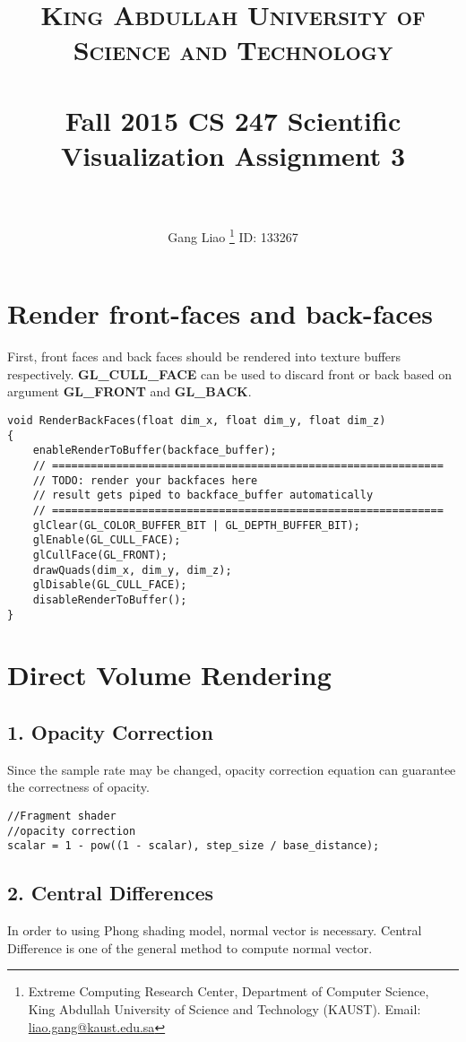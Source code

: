 \documentclass[12pt,letterpaper,fleqn]{article}          %
\title{
		\usefont{OT1}{bch}{b}{n}
		\normalfont \normalsize \textsc{ \fontspec{Zapfino} King Abdullah University of Science and Technology} \\ [25pt]
		\horrule{0.5pt} \\[0.4cm]
         \Large Fall 2015 CS 247 Scientific Visualization Assignment 3\\
		\horrule{2pt} \\
}
\author{Gang Liao \footnote{Extreme Computing Research Center, Department of Computer Science, King Abdullah University of Science and Technology (KAUST).  Email: \href{mailto:liao.gang@kaust.edu.sa}{liao.gang@kaust.edu.sa}} \hspace{1.05cm}ID: 133267 }
\begin{document}
\maketitle

\onehalfspacing

\section{Render front-faces and back-faces}
First, front faces and back faces should be rendered into texture buffers respectively. \textbf{GL\_CULL\_FACE} can be used to discard 
front or back based on argument \textbf{GL\_FRONT} and \textbf{GL\_BACK}.

\begin{lstlisting}
void RenderBackFaces(float dim_x, float dim_y, float dim_z)
{
	enableRenderToBuffer(backface_buffer);
	// =============================================================
	// TODO: render your backfaces here
	// result gets piped to backface_buffer automatically
	// =============================================================
	glClear(GL_COLOR_BUFFER_BIT | GL_DEPTH_BUFFER_BIT);
	glEnable(GL_CULL_FACE);
	glCullFace(GL_FRONT);
	drawQuads(dim_x, dim_y, dim_z);
	glDisable(GL_CULL_FACE);
	disableRenderToBuffer();
}			
\end{lstlisting}


\section{Direct Volume Rendering}

\subsection*{1. Opacity Correction}
Since the sample rate may be changed, opacity correction equation can guarantee the correctness of opacity.

\begin{lstlisting}
//Fragment shader
//opacity correction
scalar = 1 - pow((1 - scalar), step_size / base_distance);
\end{lstlisting}


\subsection*{2. Central Differences}
In order to using Phong shading model, normal vector is necessary. Central Difference is one of the general method to compute normal vector.
\end{document}
